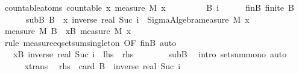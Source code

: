 \documentclass{article}
\theoremstyle{definition}
\begin{document}
\begin{isabellebody}
\isamarkupfalse%
\ countable{\isacharunderscore}atoms{\isacharcolon}\ {\isachardoublequoteopen}countable\ {\isacharbraceleft}x{\isachardot}\ measure\ M\ {\isacharbraceleft}x{\isacharbraceright}\ {\isachargreater}\ {}{\isacharbraceright}{\isachardoublequoteclose}\isanewline
{}\isamarkupfalse%
\ {\isacharminus}\isanewline
\ \ \isacommand{{\isacharbraceleft}}\isamarkupfalse%
\ \isamarkupfalse%
\ B\ i\isanewline
\ \ \ \ \isamarkupfalse%
\ finB{\isacharcolon}\ {\isachardoublequoteopen}finite\ B{\isachardoublequoteclose}\ \ \isanewline
\ \ \ \ \ \ subB{\isacharcolon}\ {\isachardoublequoteopen}B\ {\isasymsubseteq}\ {\isacharbraceleft}x{\isachardot}\ inverse\ {\isacharparenleft}real\ {\isacharparenleft}Suc\ i{\isacharparenright}{\isacharparenright}\ {\isacharless}\ Sigma{\isacharunderscore}Algebra{\isachardot}measure\ M\ {\isacharbraceleft}x{\isacharbraceright}{\isacharbraceright}{\isachardoublequoteclose}\isanewline
\ \ \ \ \isamarkupfalse%
\ {\isachardoublequoteopen}measure\ M\ B\ {\isacharequal}\ {\isacharparenleft}{\isasymSum}x{\isasymin}B{\isachardot}\ measure\ M\ {\isacharbraceleft}x{\isacharbraceright}{\isacharparenright}{\isachardoublequoteclose}\isanewline
\ \ \ \ \ \ \isamarkupfalse%
\ {\isacharparenleft}rule\ measure{\isacharunderscore}eq{\isacharunderscore}setsum{\isacharunderscore}singleton\ {\isacharbrackleft}OF\ finB{\isacharbrackright}{\isacharcomma}\ auto{\isacharparenright}\isanewline
\ \ \ \ \isamarkupfalse%
\ \isamarkupfalse%
\ {\isachardoublequoteopen}{\isasymdots}\ {\isasymge}\ {\isacharparenleft}{\isasymSum}x{\isasymin}B{\isachardot}\ inverse\ {\isacharparenleft}real\ {\isacharparenleft}Suc\ i{\isacharparenright}{\isacharparenright}{\isacharparenright}{\isachardoublequoteclose}\ {\isacharparenleft}\ {\isachardoublequoteopen}{\isacharquery}lhs\ {\isasymge}\ {\isacharquery}rhs{\isachardoublequoteclose}{\isacharparenright}\isanewline
\ \ \ \ \ \ \isamarkupfalse%
\ subB\ \isamarkupfalse%
\ {\isacharparenleft}intro\ setsum{\isacharunderscore}mono{\isacharcomma}\ auto{\isacharparenright}\isanewline
\ \ \ \ \isamarkupfalse%
\ {\isacharparenleft}xtrans{\isacharparenright}\ \isamarkupfalse%
\ {\isachardoublequoteopen}{\isacharquery}rhs\ {\isacharequal}\ card\ B\ {\isacharasterisk}\ inverse\ {\isacharparenleft}real\ {\isacharparenleft}Suc\ i{\isacharparenright}{\isacharparenright}{\isachardoublequoteclose}\isanewline

\end{isabellebody}
\end{document}
